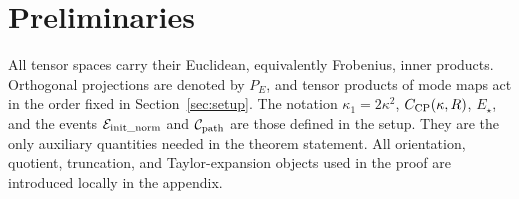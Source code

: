 \section{Preliminaries}\label{sec:preliminaries}

All tensor spaces carry their Euclidean, equivalently Frobenius, inner
products.  Orthogonal projections are denoted by $P_E$, and tensor products of
mode maps act in the order fixed in Section~\ref{sec:setup}.  The notation
$\kappa_1=2\kappa^2$, $C_{\rm CP}(\kappa,R)$, $E_\star$, and the events
$\mathcal E_{\rm init\_norm}$ and $\mathcal C_{\rm path}$ are those defined in
the setup.  They are the only auxiliary quantities needed in the theorem
statement.  All orientation, quotient, truncation, and Taylor-expansion
objects used in the proof are introduced locally in the appendix.
